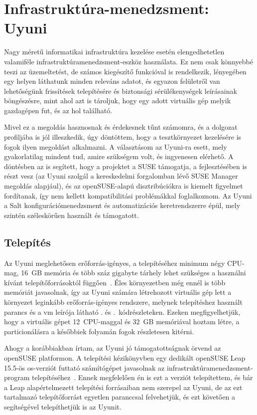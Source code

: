 
\chapter{Infrastruktúra-menedzsment: Uyuni}
\label{chap:uyuni}
Nagy méretű informatikai infrastruktúra kezelése esetén elengedhetetlen valamiféle infrastruktúramenedzsment-eszköz használata. Ez nem csak könnyebbé teszi az üzemeltetést, de számos kiegészítő funkcióval is rendelkezik, lényegében egy helyen láthatunk minden releváns adatot, és egyazon felületről van lehetőségünk frissítések telepítésére és biztonsági sérülékenységek leírásainak böngészésre, mint ahol azt is tároljuk, hogy egy adott virtuális gép melyik gazdagépen fut, és az hol található.

Mivel ez a megoldás hasznosnak és érdekesnek tűnt számomra, és a dolgozat profiljába is jól illeszkedik, úgy döntöttem, hogy a tesztkörnyezet kezelésére is fogok ilyen megoldást alkalmazni. A választásom az Uyuni-ra esett, mely gyakorlatilag mindent tud, amire szükségem volt, és ingyenesen elérhető. A döntésben az is segített, hogy a projektet a SUSE támogatja, a fejlesztésében is részt vesz (az Uyuni szolgál a kereskedelmi forgalomban lévő SUSE Manager megoldás alapjául), és az openSUSE-alapú disztribúciókra is kiemelt figyelmet fordítanak, így nem kellett kompatibilitási problémákkal foglalkoznom. Az Uyuni a Salt konfigurációmenedzsment és automatizációs keretrendszerre épül, mely szintén széleskörűen használt és támogatott.


\section{Telepítés}
\label{sect:uyuni-install}
Az Uyuni meglehetősen erőforrás-igényes, a telepítéséhez minimum négy CPU-mag, 16~GB memória és  több száz gigabyte tárhely lehet szükséges a használni kívánt telepítőforrásoktól függően~\cite{UyuniInstallGuide}. Éles környezetben még ennél is több memóriát javasolnak, így az Uyuni számára létrehozott virtuális gép lett a környezet leginkább erőforrás-igényes rendszere, melynek telepítéshez használt parancs és a \acrshort{vm} leírója látható . és .~kódrészleteken. Ezeken megfigyelhetjük, hogy a virtuális gépet 12~CPU-maggal és 32~GB memóriával hoztam létre, a particionálásra a későbbiek folyamán fogok részletesen kitérni.

Ahogy a korábbiakban írtam, az Uyuni jó támogatottságnak örvend az openSUSE platformon. A telepítési kézikönyvben egy dedikált openSUSE Leap 15.5-ös \acrshort{os}-verziót futtató számítógépet javasolnak az infrastruktúramenedzsment-program telepítéséhez~\cite{UyuniInstallGuide}.
Ennek megfelelően én is ezt a verziót telepítettem, és bár a Leap alapértelmezett telepítési forrásaiban nem szerepel az Uyuni, de az ezt tartalmazó telepítőforrást egyetlen paranccsal felvehetjük, és ezt követően a segítségével telepíthetjük is az Uyunit.

